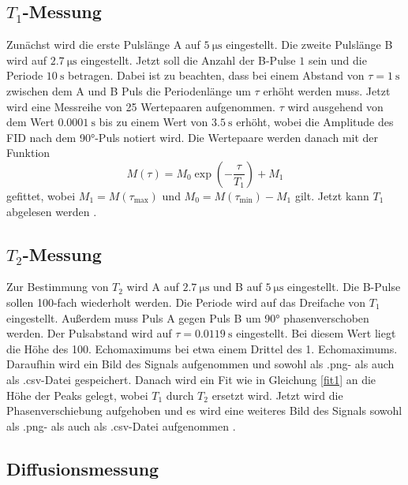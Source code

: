 \subsection{\texorpdfstring{$T_1$}{T1}-Messung}
\label{sec:T1Messung}

Zunächst wird die erste Pulslänge A auf $\SI{5}{\micro\second}$ eingestellt.
Die zweite Pulslänge B wird auf $\SI{2.7}{\micro\second}$ eingestellt.
Jetzt soll die Anzahl der B-Pulse $1$ sein und die Periode $\SI{10}{\second}$
betragen. Dabei ist zu beachten, dass bei einem Abstand von $\tau = \SI{1}{\second}$
zwischen dem A und B Puls die Periodenlänge um $\tau$ erhöht werden muss.
Jetzt wird eine Messreihe von 25 Wertepaaren aufgenommen. 
$\tau$ wird ausgehend von dem Wert $\SI{0.0001}{\second}$ bis zu einem Wert von 
$\SI{3.5}{\second}$ erhöht, wobei die Amplitude des FID nach dem 90°-Puls
notiert wird.
Die Wertepaare werden danach mit der Funktion 
\begin{equation}
    M(\tau) = M_{\text{0}} \exp{\left(-\frac{\tau}{T_{\text{1}}} \right)} + M_{\text{1}}
    \label{fit1}
\end{equation}
gefittet, wobei $M_{\text{1}} = M(\tau_{\text{max}})$ und
$M_{\text{0}} = M(\tau_{\text{min}}) - M_{\text{1}}$ gilt.
Jetzt kann $T_{\text{1}}$ abgelesen werden
\cite{anleitung}. 

\subsection{\texorpdfstring{$T_2$}{T2}-Messung}
\label{sec:T2Messung}

Zur Bestimmung von $T_{\text{2}}$ wird A auf $\SI{2.7}{\micro\second}$ und B auf
$\SI{5}{\micro\second}$ eingestellt. Die B-Pulse sollen 100-fach wiederholt werden.
Die Periode wird auf das Dreifache von $T_{\text{1}}$ eingestellt.
Außerdem muss Puls A gegen Puls B um 90° phasenverschoben werden. Der Pulsabstand wird 
auf $\tau = \SI{0.0119}{\second}$ eingestellt. Bei diesem Wert liegt die Höhe 
des 100. Echomaximums bei etwa einem Drittel des 1. Echomaximums.
Daraufhin wird ein Bild des Signals aufgenommen und sowohl als .png- als auch als 
.csv-Datei gespeichert. Danach wird ein Fit wie in Gleichung \ref{fit1} 
an die Höhe der Peaks gelegt,
wobei $T_{\text{1}}$ durch $T_{\text{2}}$ ersetzt wird.
Jetzt wird die Phasenverschiebung aufgehoben und es wird eine weiteres Bild des 
Signals sowohl als .png- als auch als .csv-Datei aufgenommen \cite{anleitung}.

\subsection{Diffusionsmessung}
\label{Diffusionsmessung}

